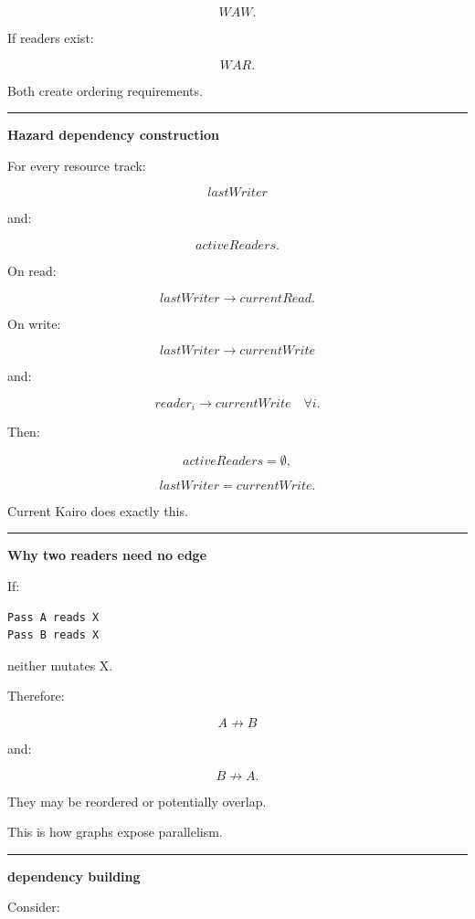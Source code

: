 \[
WAW.
\]

If readers exist:

\[
WAR.
\]

Both create ordering requirements.

\begin{center}\rule{0.5\linewidth}{0.5pt}\end{center}

\textbf{Hazard dependency construction}

For every resource track:

\[
lastWriter
\]

and:

\[
activeReaders.
\]

On read:

\[
lastWriter
\rightarrow
currentRead.
\]

On write:

\[
lastWriter
\rightarrow
currentWrite
\]

and:

\[
reader_i
\rightarrow
currentWrite
\quad\forall i.
\]

Then:

\[
activeReaders=\emptyset,
\]

\[
lastWriter=currentWrite.
\]

Current Kairo does exactly this.

\begin{center}\rule{0.5\linewidth}{0.5pt}\end{center}

\textbf{Why two readers need no edge}

If:

\begin{verbatim}
Pass A reads X
Pass B reads X
\end{verbatim}

neither mutates X.

Therefore:

\[
A
\not\rightarrow
B
\]

and:

\[
B
\not\rightarrow
A.
\]

They may be reordered or potentially overlap.

This is how graphs expose parallelism.

\begin{center}\rule{0.5\linewidth}{0.5pt}\end{center}

\textbf{dependency building}

Consider:

